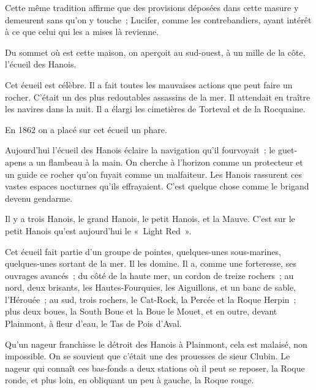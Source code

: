 \documentclass[french,twoside]{book} %
\begin{document}
Cette même tradition affirme que des provisions déposées dans cette masure y demeurent sans qu’on y touche ; Lucifer, comme les contrebandiers, ayant intérêt à ce que celui qui les a mises là revienne.\par
Du sommet où est cette maison, on aperçoit au sud-ouest, à un mille de la côte, l’écueil des Hanois.\par
Cet écueil est célèbre. Il a fait toutes les mauvaises actions que peut faire un rocher. C’était un des plus redoutables assassins de la mer. Il attendait en traître les navires dans la nuit. Il a élargi les cimetières de Torteval et de la Rocquaine.\par
 En 1862 on a placé sur cet écueil un phare.\par
Aujourd’hui l’écueil des Hanois éclaire la navigation qu’il fourvoyait ; le guet-apens a un flambeau à la main. On cherche à l’horizon comme un protecteur et un guide ce rocher qu’on fuyait comme un malfaiteur. Les Hanois rassurent ces vastes espaces nocturnes qu’ils effrayaient. C’est quelque chose comme le brigand devenu gendarme.\par
Il y a trois Hanois, le grand Hanois, le petit Hanois, et la Mauve. C’est sur le petit Hanois qu’est aujourd’hui le « Light Red ».\par
Cet écueil fait partie d’un groupe de pointes, quelques-unes sous-marines, quelques-unes sortant de la mer. Il les domine. Il a, comme une forteresse, ses ouvrages avancés ; du côté de la haute mer, un cordon de treize rochers ; au nord, deux brisants, les Hautes-Fourquies, les Aiguillons, et un banc de sable, l’Hérouée ; au sud, trois rochers, le Cat-Rock, la Percée et la Roque Herpin ; plus deux boues, la South Boue et la Boue le Mouet, et en outre, devant Plainmont, à fleur d’eau, le Tas de Pois d’Aval.\par
Qu’un nageur franchisse le détroit des Hanois à Plainmont, cela est malaisé, non impossible. On se souvient que c’était une des prouesses de sieur Clubin. Le nageur qui connaît ces bas-fonds a deux stations où il peut se reposer, la Roque ronde, et plus loin, en obliquant un peu à gauche, la Roque rouge.
\end{document}
